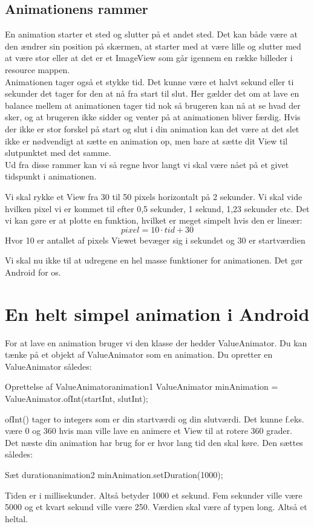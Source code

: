 \subsection{Animationens rammer}
En animation starter et sted og slutter på et andet sted. Det kan både være at den ændrer sin position på skærmen, at starter med at være lille og slutter med at være stor eller at det er et ImageView som går igennem en række billeder i resource mappen. \\
Animationen tager også et stykke tid. Det kunne være et halvt sekund eller ti sekunder det tager for den at nå fra start til slut. Her gælder det om at lave en balance mellem at animationen tager tid nok så brugeren kan nå at se hvad der sker, og at brugeren ikke sidder og venter på at animationen bliver færdig. Hvis der ikke er stor forskel på start og slut i din animation kan det være at det slet ikke er nødvendigt at sætte en animation op, men bare at sætte dit View til slutpunktet med det samme.  \\
Ud fra disse rammer kan vi så regne hvor langt vi skal være nået på et givet tidspunkt i animationen. 
\begin{example}
	Vi skal rykke et View fra 30 til 50 pixels horizontalt på 2 sekunder. Vi skal vide hvilken pixel vi er kommet til efter 0,5 sekunder, 1 sekund, 1,23 sekunder etc. Det vi kan gøre er at plotte en funktion, hvilket er meget simpelt hvis den er lineær:
	\begin{equation}
	pixel=10\cdot tid+30
	\end{equation}
	Hvor 10 er antallet af pixels Viewet bevæger sig i sekundet og 30 er startværdien
\end{example}
Vi skal nu ikke til at udregene en hel masse funktioner for animationen. Det gør Android for os.
\section{En helt simpel animation i Android}
For at lave en animation bruger vi den klasse der hedder ValueAnimator. Du kan tænke på et objekt af ValueAnimator som en animation. Du opretter en ValueAnimator således:
\begin{JavaCode}{Oprettelse af ValueAnimator}{animation1}
	ValueAnimator minAnimation = ValueAnimator.ofInt(startInt, slutInt);
\end{JavaCode}
ofInt() tager to integers som er din startværdi og din slutværdi. Det kunne f.eks. være 0 og 360 hvis man ville lave en animere et View til at rotere 360 grader. \\
Det næste din animation har brug for er hvor lang tid den skal køre. Den sættes således:
\begin{JavaCode}{Sæt duration}{animation2}
	minAnimation.setDuration(1000);	
\end{JavaCode}
Tiden er i millisekunder. Altså betyder 1000 et sekund. Fem sekunder ville være 5000 og et kvart sekund ville være 250. Værdien skal være af typen long. Altså et heltal.
